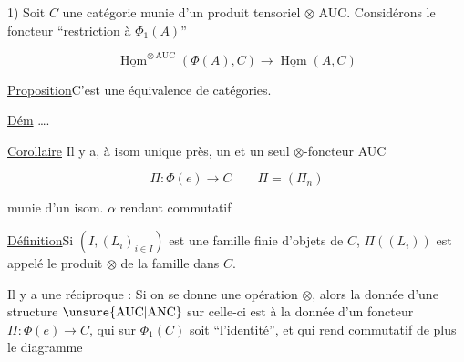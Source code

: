 1) Soit $C$ une catégorie munie d'un produit tensoriel $\otimes$ AUC. Considérons le foncteur ``restriction à $\Phi_1(A)$''

\[\underline{\operatorname{Hom}}^{\otimes\,\mathrm{AUC}}(\Phi(A),C)\longrightarrow\underline{\operatorname{Hom}}(A,C)\]

\uline{Proposition}\quad C'est une équivalence de catégories.

\uline{Dém} \ldots.

\uline{Corollaire}\quad {} Il y a, à isom unique près, un et un seul $\otimes$-foncteur AUC

\[\Pi:\Phi(e)\longrightarrow C\qquad\Pi=(\Pi_n)\]


munie d'un isom. $\alpha$ rendant commutatif


\uline{Définition}\quad Si $(I,(L_i)_{i\in I})$ est une famille finie d'objets de $C$, $\Pi((L_i))$ est appelé le produit $\otimes$ de la famille dans $C$.

Il y a une réciproque : Si on se donne    une opération $\otimes$, alors la donnée d'une structure $\unsure{\mathrm{AUC}|\mathrm{ANC}}$ sur celle-ci est  à la donnée d'un foncteur $\Pi:\Phi(e)\to C$,  qui sur $\Phi_1(C)$ soit ``l'identité'', et  qui  rend commutatif de plus le diagramme


